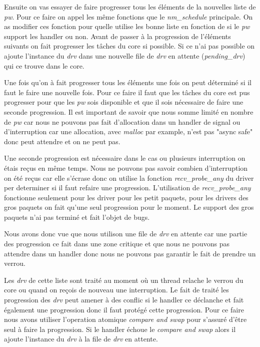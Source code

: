 Ensuite on vas essayer de faire progresser tous les éléments de la nouvelles liste de \emph{pw}.
Pour ce faire on appel les même fonctions que le \emph{nm_schedule} principale.
On as modifier ces fonction pour quelle utilise les bonne liste en fonction de si le \emph{pw} support les handler ou non.
Avant de passer à la progression de l'éléments suivants on fait progresser les tâches du core si possible.
Si ce n'ai pas possible on ajoute l'instance du \emph{drv} dans une nouvelle file de \emph{drv} en attente (\emph{pending_drv}) qui ce trouve dans le core.

Une fois qu'on à fait progresser tous les éléments une fois on peut déterminé si il faut le faire une nouvelle fois.
Pour ce faire il faut que les tâches du core est pus progresser pour que les \emph{pw} sois disponible et que il sois nécessaire de faire une seconde progression.
Il est important de savoir que nous somme limité en nombre de \emph{pw} car nous ne pouvons pas fait d'allocation dans un handler de signal ou d'interruption
car une allocation, avec \emph{malloc} par example, n'est pas "async safe" donc peut attendre et on ne peut pas.

Une seconde progression est nécessaire dans le cas ou plusieurs interruption on étais reçus en même temps.
Nous ne pouvons pas savoir combien d'interruption on été reçus car elle s'écrase donc
on utilise la fonction \emph{recv_probe_any} du driver per determiner si il faut refaire une progression.
L'utilisation de \emph{recv_probe_any} fonctionne seulement pour les driver pour les petit paquets,
pour les drivers des gros paquets on fait qu'une seul progression pour le moment.
Le support des gros paquets n'ai pas terminé et fait l'objet de bugs.

Nous avons donc vue que nous utilison une file de \emph{drv} en attente car une partie des progression ce fait dans une zone critique et
que nous ne pouvons pas attendre dans un handler donc nous ne pouvons pas garantir le fait de prendre un verrou.

Les \emph{drv} de cette liste sont traité au moment où un thread relache le verrou du core ou quand on reçois de nouveau une interruption.
Le fait de traité les progression des \emph{drv} peut amener à des conflic si le handler ce déclanche et
fait également une progression donc il faut protégé cette progression.
Pour ce faire nous avons utiliser l'operation atomique \emph{compare and swap} pour s'assuré d'être seul à faire la progression.
Si le handler échoue le \emph{compare and swap} alors il ajoute l'instance du \emph{drv} à la file de \emph{drv} en attente.

